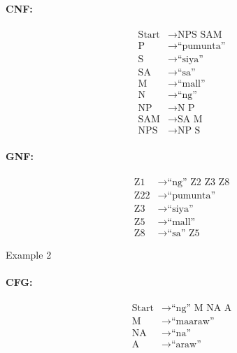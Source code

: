 \paragraph{CNF:}
\begin{equation*}
    \begin{aligned}
        \text{Start}   & \rightarrow \text{NPS SAM} \\
        \text{P} & \rightarrow \text{“pumunta”} \\
        \text{S} & \rightarrow \text{“siya”} \\
        \text{SA} & \rightarrow \text{“sa”} \\
        \text{M} & \rightarrow \text{“mall”} \\
        \text{N} & \rightarrow \text{“ng”} \\
        \text{NP} & \rightarrow \text{N P} \\
        \text{SAM} & \rightarrow \text{SA M} \\
        \text{NPS} & \rightarrow \text{NP S}
    \end{aligned}
\end{equation*}

\paragraph{GNF:}
\begin{equation*}
    \begin{aligned}
        \text{Z1}   & \rightarrow \text{“ng” Z2 Z3 Z8} \\
        \text{Z22} & \rightarrow \text{“pumunta”} \\
        \text{Z3} & \rightarrow \text{“siya”} \\
        \text{Z5} & \rightarrow \text{“mall”} \\
        \text{Z8} & \rightarrow \text{“sa” Z5}
    \end{aligned}
\end{equation*}

Example 2
\paragraph{CFG:}
\begin{equation*}
    \begin{aligned}
        \text{Start}   & \rightarrow \text{“ng” M NA A}   \\
        \text{M} & \rightarrow \text{“maaraw”} \\
        \text{NA} & \rightarrow \text{“na”} \\
        \text{A} & \rightarrow \text{“araw”}
    \end{aligned}
\end{equation*}

